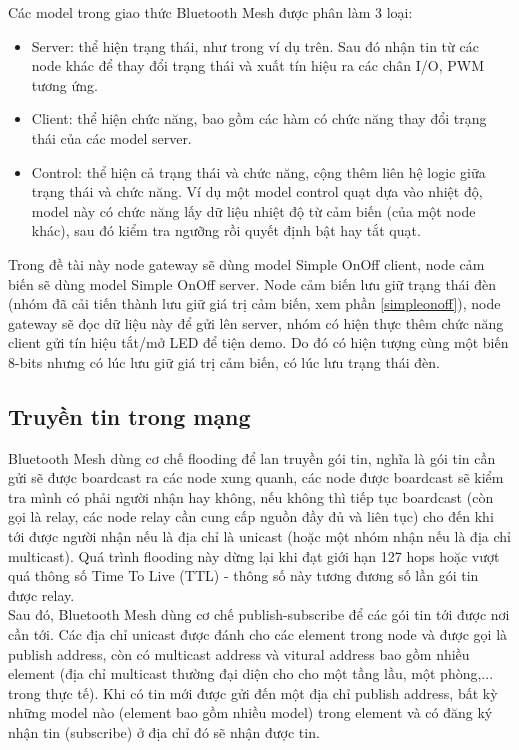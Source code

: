             Các model trong giao thức Bluetooth Mesh được phân làm 3 loại:
            \begin{itemize}
                \item Server: thể hiện trạng thái, như trong ví dụ trên. Sau đó nhận tin từ các node khác để thay đổi trạng thái và xuất tín hiệu ra các chân I/O, PWM tương ứng.
                \item Client: thể hiện chức năng, bao gồm các hàm có chức năng thay đổi trạng thái của các model server.
                \item Control: thể hiện cả trạng thái và chức năng, cộng thêm liên hệ logic giữa trạng thái và chức năng. Ví dụ một model control quạt dựa vào nhiệt độ, model này có chức năng lấy dữ liệu nhiệt độ từ cảm biến (của một node khác), sau đó kiểm tra ngưỡng rồi quyết định bật hay tắt quạt.
            \end{itemize}

            Trong đề tài này node gateway sẽ dùng model Simple OnOff client, node cảm biến sẽ dùng model Simple OnOff server. Node cảm biến lưu giữ trạng thái đèn (nhóm đã cải tiến thành lưu giữ giá trị cảm biến, xem phần \ref{simpleonoff}), node gateway sẽ đọc dữ liệu này để gửi lên server, nhóm có hiện thực thêm chức năng client gửi tín hiệu tắt/mở LED để tiện demo. Do đó có hiện tượng cùng một biến 8-bits nhưng có lúc lưu giữ giá trị cảm biến, có lúc lưu trạng thái đèn.
            \subsection{Truyền tin trong mạng}
            Bluetooth Mesh dùng cơ chế flooding để lan truyền gói tin, nghĩa là gói tin cần gửi sẽ được boardcast ra các node xung quanh, các node được boardcast sẽ kiểm tra mình có phải người nhận hay không, nếu không thì tiếp tục boardcast (còn gọi là relay, các node relay cần cung cấp nguồn đầy đủ và liên tục) cho đến khi tới được người nhận nếu là địa chỉ là unicast (hoặc một nhóm nhận nếu là địa chỉ multicast). Quá trình flooding này dừng lại khi đạt giới hạn 127 hops hoặc vượt quá thông số Time To Live (TTL) - thông số này tương đương số lần gói tin được relay\cite{meshgloss}.\\
            Sau đó, Bluetooth Mesh dùng cơ chế publish-subscribe để các gói tin tới được nơi cần tới. Các địa chỉ unicast được đánh cho các element trong node và được gọi là publish address, còn có multicast address và vitural address bao gồm nhiều element (địa chỉ multicast thường đại diện cho cho một tầng lầu, một phòng,... trong thực tế). Khi có tin mới được gửi đến một địa chỉ publish address, bất kỳ những model nào (element bao gồm nhiều model) trong element và có đăng ký nhận tin (subscribe) ở địa chỉ đó sẽ nhận được tin.
        
